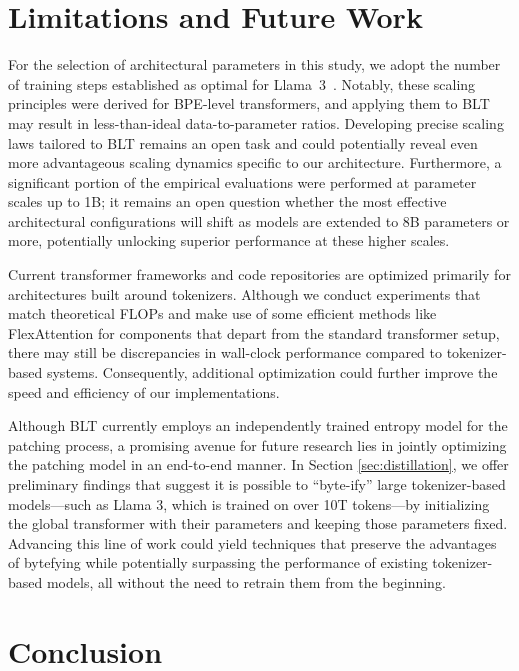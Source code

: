 \section{Limitations and Future Work}

For the selection of architectural parameters in this study, we adopt the number of training steps established as optimal for Llama~3~\citep{dubey2024llama}. Notably, these scaling principles were derived for BPE-level transformers, and applying them to {\textsc BLT} may result in less-than-ideal data-to-parameter ratios. Developing precise scaling laws tailored to {\textsc BLT} remains an open task and could potentially reveal even more advantageous scaling dynamics specific to our architecture. Furthermore, a significant portion of the empirical evaluations were performed at parameter scales up to 1B; it remains an open question whether the most effective architectural configurations will shift as models are extended to 8B parameters or more, potentially unlocking superior performance at these higher scales.

Current transformer frameworks and code repositories are optimized primarily for architectures built around tokenizers. Although we conduct experiments that match theoretical FLOPs and make use of some efficient methods like FlexAttention for components that depart from the standard transformer setup, there may still be discrepancies in wall-clock performance compared to tokenizer-based systems. Consequently, additional optimization could further improve the speed and efficiency of our implementations.

Although {\textsc BLT} currently employs an independently trained entropy model for the patching process, a promising avenue for future research lies in jointly optimizing the patching model in an end-to-end manner. In Section \ref{sec:distillation}, we offer preliminary findings that suggest it is possible to ``byte-ify'' large tokenizer-based models—such as Llama 3, which is trained on over 10T tokens—by initializing the global transformer with their parameters and keeping those parameters fixed. Advancing this line of work could yield techniques that preserve the advantages of bytefying while potentially surpassing the performance of existing tokenizer-based models, all without the need to retrain them from the beginning.

\section{Conclusion}
\label{section:conclusion}


